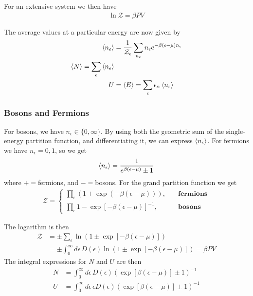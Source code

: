 \documentclass[a4paper, english, 12pt]{article}
\newcommand{\eps}{\epsilon}
\begin{document}
\begin{multicols*}{2}
For an extensive system we then have 
\begin{align*}
    \ln\mathcal{Z} = \beta PV 
\end{align*}

The average values at a particular energy are now given by 
\begin{align*}
    \expval{n_\epsilon} &= \frac{1}{\mathcal{Z}_\epsilon} \sum_{n_\epsilon} n_\epsilon e^{-\beta(\epsilon-\mu)n_\epsilon} \\ 
    \expval{N} = \sum_\epsilon \expval{n_\epsilon} \\ 
    U &= \expval{E} = \sum_\eps \eps_\alpha \expval{n_\eps}
\end{align*}

\subsubsection*{\scriptsize Bosons and Fermions}
For bosons, we have $n_\eps\in\{0,\infty\}$. By using both the geometric sum of the single-energy partition function, and differentiating it, we can express $\expval{n_\eps}$. For fermions we have $n_\eps=0,1$, so we get 
\begin{align*}
    \expval{n_\eps} = \frac{1}{e^{\beta(\eps-\mu)} \pm 1}
\end{align*}
where $+=$fermions, and $-=$bosons. For the grand partition function we get 
\begin{align*}
    \mathcal{Z} = \begin{cases}
        \prod_\eps (1+\exp(-\beta(\eps-\mu))),\quad&\textbf{fermions} \\ 
        \prod_\eps {1-\exp[-\beta(\eps-\mu)]}^{-1},\quad&\textbf{bosons}
    \end{cases}
\end{align*}

The logarithm is then 
\begin{align*}
    \mathcal{Z} &= \pm \sum_\eps \ln(1 \pm \exp[-\beta(\eps-\mu)]) \\ 
    &= \pm \int_0^\infty d\eps\, D(\eps) \ln(1 \pm \exp[-\beta(\eps-\mu)]) = \beta PV
\end{align*}
The integral expressions for $N$ and $U$ are then 
\begin{align*}
    N &= \int_0^\infty d\eps\,D(\eps) (\exp[\beta(\eps-\mu)]\pm1)^{-1} \\ 
    U &= \int_0^\infty d\eps\, \eps D(\eps) (\exp[\beta(\eps-\mu)]\pm1)^{-1}
\end{align*}



\end{multicols*}
\end{document}
